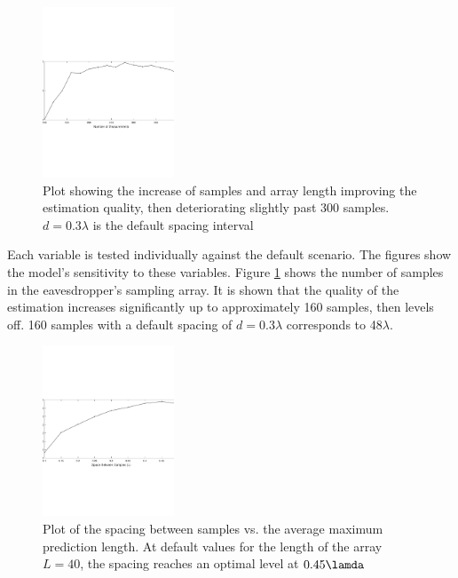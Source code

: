 \documentclass{allertonproc}
\begin{document}

\begin{figure}[ht!]
\begin{center}
\includegraphics[height=2in]{numMeasurements}
\caption{Plot showing the increase of samples and array length improving the estimation quality, then deteriorating slightly past 300 samples. $d = 0.3\lambda$ is the default spacing interval}\label{M}
\end{center}
\end{figure}

Each variable is tested individually against the default scenario. The figures show the model's sensitivity to these variables. Figure \ref{M} shows the number of samples in the eavesdropper's sampling array. It is shown that the quality of the estimation increases significantly up to approximately 160 samples, then levels off. 160 samples with a default spacing of $d = 0.3\lambda$ corresponds to 48$\lambda$. 
\begin{figure}[ht!]
\begin{center}
\includegraphics[height=2in]{wavelengths}
\caption{Plot of the spacing between samples vs. the average maximum prediction length. At default values for the length of the array $L=40$, the spacing reaches an optimal level at $0.45\lamda$ }\label{spacing}
\end{center}
\end{figure}
\end{document}
